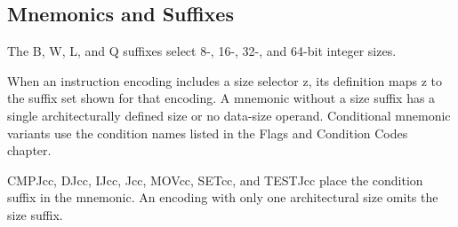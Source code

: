 \subsection*{Mnemonics and Suffixes}
The B, W, L, and Q suffixes select 8-, 16-, 32-, and 64-bit integer sizes.

When an instruction encoding includes a size selector z, its definition maps z to the suffix set shown for that encoding. A
mnemonic without a size suffix has a single architecturally defined size or no data-size operand.
Conditional mnemonic variants use the condition names listed in the Flags and Condition Codes chapter.

CMPJcc, DJcc, IJcc, Jcc, MOVcc, SETcc, and TESTJcc place the condition suffix in the mnemonic. An encoding with
only one architectural size omits the size suffix.
